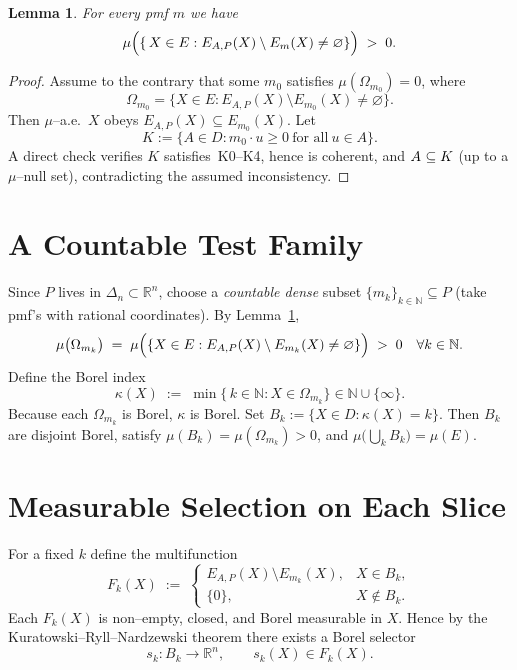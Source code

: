 \documentclass[11pt]{article}
\newtheorem{lemma}{Lemma}
\newcommand{\R}{\mathbb{R}}
\newcommand{\N}{\mathbb{N}}
\begin{document}
\begin{lemma}
\label{lem:positive_miss}
For every pmf $m$ we have
\[
\mu\Bigl(\{\,X\in E : E_{A,P}(X)\setminus E_{m}(X)\neq\varnothing\}\Bigr)\;>\;0.
\]
\end{lemma}

\begin{proof}
Assume to the contrary that some $m_{0}$ satisfies $\mu(\Omega_{m_{0}})=0$, where
\[
\Omega_{m_{0}}=\{X\in E : E_{A,P}(X)\setminus E_{m_{0}}(X)\neq\varnothing\}.
\]
Then $\mu$--a.e.\ $X$ obeys $E_{A,P}(X)\subseteq E_{m_{0}}(X)$.
Let
\[
K:=\{A\in D : m_{0}\cdot u\ge 0\ \text{for all}\ u\in A\}.
\]
A direct check verifies $K$ satisfies~K0--K4, hence is coherent,
and $A^{\*}\subseteq K$ (up to a $\mu$--null set), contradicting the assumed inconsistency.
\end{proof}

\section{A Countable Test Family}

Since $P$ lives in $\Delta_{n}\subset\R^{n}$,
choose a \emph{countable dense} subset $\{m_{k}\}_{k\in\N}\subseteq P$ (take pmf's with rational coordinates).
By Lemma~\ref{lem:positive_miss},
\[
\mu\bigl(\Omega_{m_{k}}\bigr)\;=\;\mu\Bigl(\{X\in E : E_{A,P}(X)\setminus E_{m_{k}}(X)\neq\varnothing\}\Bigr)\;>\;0
\quad\forall k\in\N.
\]
Define the Borel index
\[
\kappa(X)\;:=\;\min\bigl\{\,k\in\N : X\in\Omega_{m_{k}}\bigr\}\in\N\cup\{\infty\}.
\]
Because each $\Omega_{m_{k}}$ is Borel, $\kappa$ is Borel.  
Set $B_{k}:=\{X\in D : \kappa(X)=k\}$.
Then $B_{k}$ are disjoint Borel, satisfy $\mu(B_{k})=\mu(\Omega_{m_{k}})>0$, and
$\mu\bigl(\bigcup_{k}B_{k}\bigr)=\mu(E)$.

\section{Measurable Selection on Each Slice}

For a fixed $k$ define the multifunction
\[
F_{k}(X)\;:=\;
\begin{cases}
E_{A,P}(X)\setminus E_{m_{k}}(X), & X\in B_{k},\\[4pt]
\{0\}, & X\notin B_{k}.
\end{cases}
\]
Each $F_{k}(X)$ is non--empty, closed, and Borel measurable in $X$.
Hence by the Kuratowski--Ryll--Nardzewski theorem
there exists a Borel selector
\[
s_{k}:B_{k}\longrightarrow\R^{n},\qquad s_{k}(X)\in F_{k}(X).
\]
\end{document}
